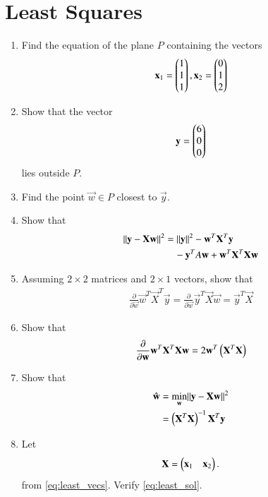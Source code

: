 \documentclass[journal,12pt,twocolumn]{IEEEtran}
\renewcommand\thesection{\arabic{section}}
\begin{document}
\section{Least Squares}
\begin{enumerate}[label=\thesection.\arabic*
,ref=\thesection.\theenumi]
\item Find the equation of the plane $P$
containing the vectors 
%
\begin{align}
\label{eq:least_vecs}
\mathbf{x}_1 = \begin{pmatrix}1 \\ 1 \\ 1\end{pmatrix}
,
\mathbf{x}_2 = \begin{pmatrix}0 \\ 1 \\ 2\end{pmatrix}
\end{align}
%
\item Show that the vector 
\begin{align}
\mathbf{y} = \begin{pmatrix}6 \\ 0 \\ 0\end{pmatrix}
\end{align}
lies outside $P$.
\item Find the point $\vec{w} \in P$ closest to $\vec{y}$.
\item Show that
\begin{align}
\lVert\mathbf{y}-\mathbf{X}\mathbf{w}\rVert^2 &= \lVert\mathbf{y}\rVert^2 - \mathbf{w}^T\mathbf{X}^T\mathbf{y} 
\\
& \quad - \mathbf{y}^TA\mathbf{w}+\mathbf{w}^T\mathbf{X}^T\mathbf{X}\mathbf{w}
\end{align}
%
\item Assuming $2\times 2$ matrices and $2 \times 1$ vectors, show that
\begin{align}
\frac{\partial}{\partial\vec{w}}\vec{w}^T\vec{X}^T\vec{y} = \frac{\partial}{\partial\vec{w}}\vec{y}^T\vec{X}\vec{w} = 
\vec{y}^T\vec{X}
\end{align}
\item Show that
\begin{align}
\frac{\partial}{\partial\mathbf{w}}\mathbf{w}^T\mathbf{X}^T\mathbf{X}\mathbf{w} = 2\mathbf{w}^T\left(\mathbf{X}^T\mathbf{X}\right)
\end{align}
\item Show that 
\begin{align}
\hat{\mathbf{w}} &= \min_{\mathbf{w}}\lVert\mathbf{y}-\mathbf{X}\mathbf{w}\rVert^2
\\
 &= \left(\mathbf{X}^T\mathbf{X}\right)^{-1}\mathbf{X}^T \mathbf{y}
\label{eq:least_sol}
\end{align}
\item Let 
\begin{align}
\mathbf{X} = \begin{pmatrix}\mathbf{x}_1 & \mathbf{x}_2\end{pmatrix}.
\end{align}
from \eqref{eq:least_vecs}.
Verify \eqref{eq:least_sol}.
\end{enumerate}
\end{document}
